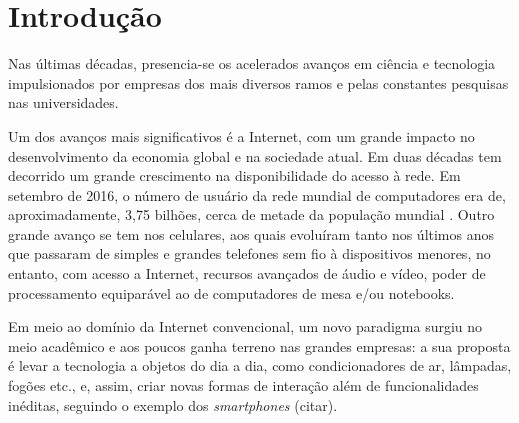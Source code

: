 \chapter{Introdução}









Nas últimas décadas, presencia-se os acelerados avanços em ciência e tecnologia impulsionados por empresas dos mais diversos ramos e pelas constantes pesquisas nas universidades. 

Um dos avanços mais significativos é a Internet, com um grande impacto no desenvolvimento da economia global e na sociedade atual. Em duas décadas tem decorrido um grande crescimento na disponibilidade do acesso à rede. Em setembro de 2016, o número de usuário da rede mundial de computadores era de, aproximadamente, 3,75 bilhões, cerca de metade da população mundial \cite{Stats2017}.  Outro grande avanço se tem nos celulares, aos quais evoluíram tanto nos últimos anos que passaram de simples e grandes telefones sem fio à dispositivos menores, no entanto, com acesso a Internet, recursos avançados de áudio e vídeo, poder de processamento equiparável ao de computadores de mesa e/ou notebooks.

Em meio ao domínio da Internet convencional, um novo paradigma surgiu no meio acadêmico e aos poucos ganha terreno nas grandes empresas: a sua proposta é levar a tecnologia a objetos do dia a dia, como condicionadores de ar, lâmpadas, fogões etc., e, assim, criar novas formas de interação além de funcionalidades inéditas, seguindo o exemplo dos \textit{smartphones} (citar). 

